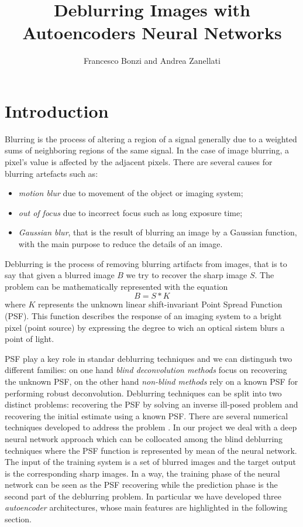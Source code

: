 \documentclass[12pt,a4paper]{article}
\title{Deblurring Images with Autoencoders Neural Networks}
\author{Francesco Bonzi and Andrea Zanellati}
\date{}
\begin{document}
\maketitle
\newpage
\tableofcontents
\newpage

\section{Introduction}
Blurring is the process of altering a region of a signal generally due to  a weighted sums of neighboring regions of the same signal. In the case of image blurring, a pixel’s value is affected by the adjacent pixels. There are several causes for blurring artefacts such as\cite {P&V&G}: 
\begin{itemize}
\item \textit{motion blur} due to movement of the object or imaging system;
\item \textit{out of focus} due to incorrect focus such as long exposure time;
\item \textit{Gaussian blur}, that is the result of blurring an image by a Gaussian function, with the main purpose to reduce the details of an image.
\end{itemize}

Deblurring is the process of removing blurring artifacts from images, that is to say that given a blurred image $B$ we try to recover the sharp image $S$. The problem can be mathematically represented with the equation \begin{equation} B = S * K \end{equation} where $K$ represents the unknown linear shift-invariant Point Spread Function (PSF). This function describes the response of an imaging system to a bright pixel (point source) by expressing the degree to wich an optical sistem blurs a point of light.

PSF play a key role in standar deblurring techniques and we can distingush two different families: on one hand \textit{blind deconvolution methods} focus on recovering the unknown PSF, on the other hand \textit{non-blind methods} rely on a known PSF for performing robust deconvolution. Deblurring techniques can be split into two distinct problems: recovering the PSF by solving an inverse ill-posed problem and recovering the initial estimate using a known PSF. There are several numerical techniques developed to address the problem \cite{H&Al}. In our project we deal with a deep neural network approach which can be collocated among the blind deblurring techniques where the PSF function is represented by mean of the neural network. The input of the training system is a set of blurred images and the target output is the corresponding sharp images. In a way, the training phase of the neural network can be seen as the  PSF recovering while the prediction phase is the second part of the deblurring problem. In particular we have developed three \textit{autoencoder} architectures, whose main features are highlighted in the following section. 
\end{document}
